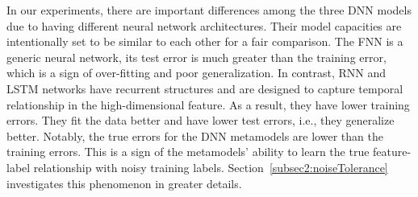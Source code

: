In our experiments, there are important differences among the three DNN models due to having different neural network architectures.
Their model capacities are intentionally set to be similar to each other for a fair comparison.
The FNN is a generic neural network, its test error is much greater than the training error, which is a sign of over-fitting and poor generalization.
In contrast, RNN and LSTM networks have recurrent structures and are designed to capture temporal relationship in the high-dimensional feature.
As a result, they have lower training errors.
They fit the data better and have lower test errors, i.e., they generalize better.
Notably, the true errors for the DNN metamodels are lower than the training errors.
This is a sign of the metamodels' ability to learn the true feature-label relationship with noisy training labels. 
Section~\ref{subsec2:noiseTolerance} investigates this phenomenon in greater details.

